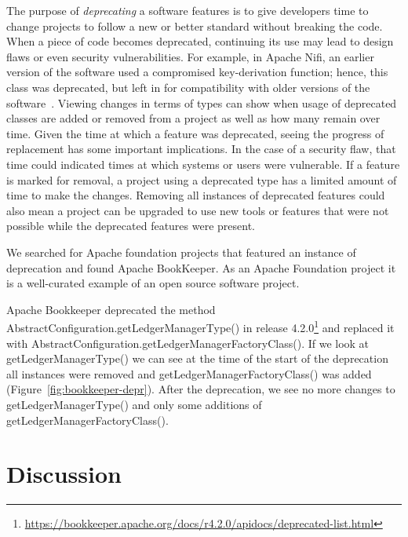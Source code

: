 The purpose of \emph{deprecating} a software features is to give developers time to change projects to follow a new or better standard without breaking the code. When a piece of code becomes deprecated, continuing its use may lead to design flaws or even security vulnerabilities. For example, in Apache Nifi, an earlier version of the software used a compromised key-derivation function; hence, this class was deprecated, but left in for compatibility with older versions of the software~\cite{nifi}. Viewing changes in terms of types can show when usage of deprecated classes are added or removed from a project as well as how many remain over time. Given the time at which a feature was deprecated, seeing the progress of replacement has some important implications. In the case of a security flaw, that time could indicated times at which systems or users were vulnerable. If a feature is marked for removal, a project using a deprecated type has a limited amount of time to make the changes. Removing all instances of deprecated features could also mean a project can be upgraded to use new tools or features that were not possible while the deprecated features were present.

We searched for Apache foundation projects that featured an instance of deprecation and found Apache BookKeeper. As an Apache Foundation project it is a well-curated example of an open source software project.

Apache Bookkeeper deprecated the method AbstractConfiguration.getLedgerManagerType() in release 4.2.0\footnote{\url{https://bookkeeper.apache.org/docs/r4.2.0/apidocs/deprecated-list.html}} and replaced it with AbstractConfiguration.getLedgerManagerFactoryClass(). If we look at getLedgerManagerType() we can see at the time of the start of the deprecation all instances were removed and getLedgerManagerFactoryClass() was added (Figure~\ref{fig:bookkeeper-depr}). After the deprecation, we see no more changes to getLedgerManagerType() and only some additions of getLedgerManagerFactoryClass().

\section{Discussion}

